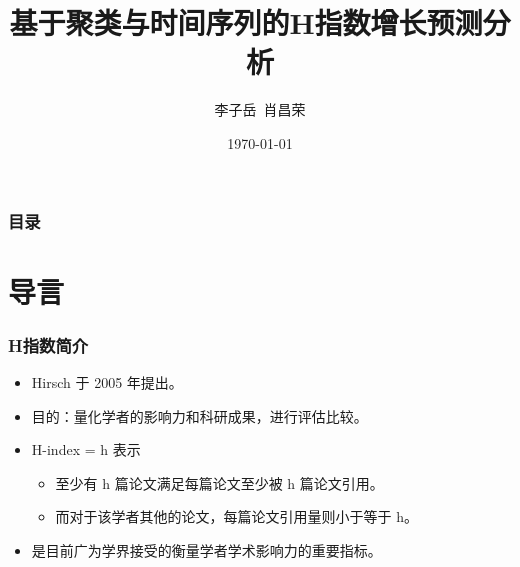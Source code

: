 \documentclass[11pt,compress,t, xcolor=table]{beamer}
\begin{document}
\title[{H指数预测分析}]%
  {基于聚类与时间序列的H指数增长预测分析}

\author[LI, XIAO]%
  {李子岳\ 肖昌荣 \rule[0pt]{0pt}{20pt}}

\institute[SEM 71]{\textcolor[rgb]{0.0,0.0,0.10}%
  {\small\ttfamily 清华大学经济管理学院}
}

\date[\today]{\small \today}

\begin{frame}[plain]
  \titlepage
\end{frame}

\begin{frame}
  \frametitle{目录}
   \tableofcontents[hideallsubsections] %
\end{frame}


\section[导言]{导言}

\AtBeginSection[] %
{ \begin{frame}<beamer> %
	\tableofcontents[currentsection,hideallsubsections]%
\end{frame}
}

\begin{frame}
	\frametitle{H指数简介}

\begin{itemize}
	\item \textcolor{TsinghuaPurple}{Hirsch} 于 2005 年提出。
	\smallskip
	
	\item 目的：量化学者的影响力和科研成果，进行评估比较。
	\smallskip
	
	\item H-index = h 表示
	\begin{itemize}
		\item 至少有 h 篇论文满足每篇论文至少被 h 篇论文引用。
		\smallskip
		\item 而对于该学者其他的论文，每篇论文引用量则小于等于 h。
	\end{itemize}
	\smallskip
	
	\item 是目前广为学界接受的衡量学者学术影响力的重要指标。
\end{itemize}
\end{frame}
\end{document}
